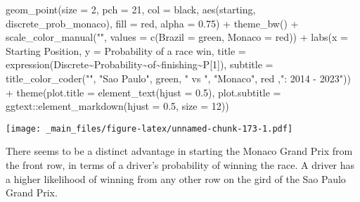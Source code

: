 \documentclass[
]{book}
\newenvironment{Shaded}{\begin{snugshade}}{\end{snugshade}}
\newcommand{\AttributeTok}[1]{\textcolor[rgb]{0.77,0.63,0.00}{#1}}
\newcommand{\DecValTok}[1]{\textcolor[rgb]{0.00,0.00,0.81}{#1}}
\newcommand{\FloatTok}[1]{\textcolor[rgb]{0.00,0.00,0.81}{#1}}
\newcommand{\FunctionTok}[1]{\textcolor[rgb]{0.00,0.00,0.00}{#1}}
\newcommand{\NormalTok}[1]{#1}
\newcommand{\OtherTok}[1]{\textcolor[rgb]{0.56,0.35,0.01}{#1}}
\newcommand{\SpecialCharTok}[1]{\textcolor[rgb]{0.00,0.00,0.00}{#1}}
\newcommand{\StringTok}[1]{\textcolor[rgb]{0.31,0.60,0.02}{#1}}
\begin{document}
\begin{Shaded}
\begin{Highlighting}[]
  \FunctionTok{geom\_point}\NormalTok{(}\AttributeTok{size =} \DecValTok{2}\NormalTok{, }\AttributeTok{pch =} \DecValTok{21}\NormalTok{, }\AttributeTok{col =} \StringTok{\textquotesingle{}black\textquotesingle{}}\NormalTok{, }\FunctionTok{aes}\NormalTok{(starting, discrete\_prob\_monaco), }\AttributeTok{fill =} \StringTok{\textquotesingle{}red\textquotesingle{}}\NormalTok{, }\AttributeTok{alpha =} \FloatTok{0.75}\NormalTok{) }\SpecialCharTok{+}
  \FunctionTok{theme\_bw}\NormalTok{() }\SpecialCharTok{+}
  \FunctionTok{scale\_color\_manual}\NormalTok{(}\StringTok{""}\NormalTok{, }\AttributeTok{values =} \FunctionTok{c}\NormalTok{(}\StringTok{\textquotesingle{}Brazil\textquotesingle{}} \OtherTok{=} \StringTok{\textquotesingle{}green\textquotesingle{}}\NormalTok{, }\StringTok{\textquotesingle{}Monaco\textquotesingle{}} \OtherTok{=} \StringTok{\textquotesingle{}red\textquotesingle{}}\NormalTok{)) }\SpecialCharTok{+}
  \FunctionTok{labs}\NormalTok{(}\AttributeTok{x =} \StringTok{\textquotesingle{}Starting Position\textquotesingle{}}\NormalTok{,}
       \AttributeTok{y =} \StringTok{\textquotesingle{}Probability of a race win\textquotesingle{}}\NormalTok{,}
       \AttributeTok{title =} \FunctionTok{expression}\NormalTok{(Discrete}\SpecialCharTok{\textasciitilde{}}\NormalTok{Probability}\SpecialCharTok{\textasciitilde{}}\NormalTok{of}\SpecialCharTok{\textasciitilde{}}\NormalTok{finishing}\SpecialCharTok{\textasciitilde{}}\NormalTok{P[}\DecValTok{1}\NormalTok{]),}
       \AttributeTok{subtitle =} \FunctionTok{title\_color\_coder}\NormalTok{(}\StringTok{""}\NormalTok{, }\StringTok{"Sao Paulo"}\NormalTok{, }\StringTok{\textquotesingle{}green\textquotesingle{}}\NormalTok{, }\StringTok{" vs "}\NormalTok{, }\StringTok{"Monaco"}\NormalTok{, }\StringTok{\textquotesingle{}red\textquotesingle{}}\NormalTok{ ,}\StringTok{": 2014 {-} 2023"}\NormalTok{)) }\SpecialCharTok{+}
  \FunctionTok{theme}\NormalTok{(}\AttributeTok{plot.title =} \FunctionTok{element\_text}\NormalTok{(}\AttributeTok{hjust =} \FloatTok{0.5}\NormalTok{),}
        \AttributeTok{plot.subtitle =}\NormalTok{ ggtext}\SpecialCharTok{::}\FunctionTok{element\_markdown}\NormalTok{(}\AttributeTok{hjust =} \FloatTok{0.5}\NormalTok{, }\AttributeTok{size =} \DecValTok{12}\NormalTok{)) }
\end{Highlighting}
\end{Shaded}

\texttt{[image: \_main\_files/figure-latex/unnamed-chunk-173-1.pdf]}

There seems to be a distinct advantage in starting the Monaco Grand Prix from the front row, in terms of a driver's probability of winning the race. A driver has a higher likelihood of winning from any other row on the gird of the Sao Paulo Grand Prix.
\end{document}
